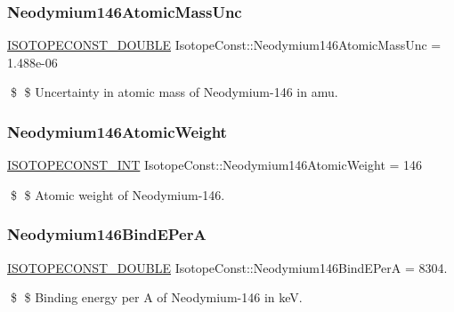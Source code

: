 \subsubsection{\texorpdfstring{Neodymium146\+Atomic\+Mass\+Unc}{Neodymium146AtomicMassUnc}}
{\footnotesize\ttfamily \mbox{\hyperlink{group___isotope_const-_macros_ga8f45a7272ce02c0b4c65c44636ed719a}{I\+S\+O\+T\+O\+P\+E\+C\+O\+N\+S\+T\+\_\+\+D\+O\+U\+B\+LE}} Isotope\+Const\+::\+Neodymium146\+Atomic\+Mass\+Unc = 1.\+488e-\/06}

\$ \$ Uncertainty in atomic mass of Neodymium-\/146 in amu. \mbox{\label{group___isotope_const-_neodymium-_nd146_gaf649a2a65597e1f76ec65e5efb7fab74}} 
\subsubsection{\texorpdfstring{Neodymium146\+Atomic\+Weight}{Neodymium146AtomicWeight}}
{\footnotesize\ttfamily \mbox{\hyperlink{group___isotope_const-_macros_ga5f18360b3e99483a35c32d789e62621c}{I\+S\+O\+T\+O\+P\+E\+C\+O\+N\+S\+T\+\_\+\+I\+NT}} Isotope\+Const\+::\+Neodymium146\+Atomic\+Weight = 146}

\$ \$ Atomic weight of Neodymium-\/146. \mbox{\label{group___isotope_const-_neodymium-_nd146_gadd0880f4a80509932399a5395282079a}} 
\subsubsection{\texorpdfstring{Neodymium146\+Bind\+E\+PerA}{Neodymium146BindEPerA}}
{\footnotesize\ttfamily \mbox{\hyperlink{group___isotope_const-_macros_ga8f45a7272ce02c0b4c65c44636ed719a}{I\+S\+O\+T\+O\+P\+E\+C\+O\+N\+S\+T\+\_\+\+D\+O\+U\+B\+LE}} Isotope\+Const\+::\+Neodymium146\+Bind\+E\+PerA = 8304.}

\$ \$ Binding energy per A of Neodymium-\/146 in keV. \mbox{\label{group___isotope_const-_neodymium-_nd146_gae3292107743689ba0674ab5f52f812b7}} 
